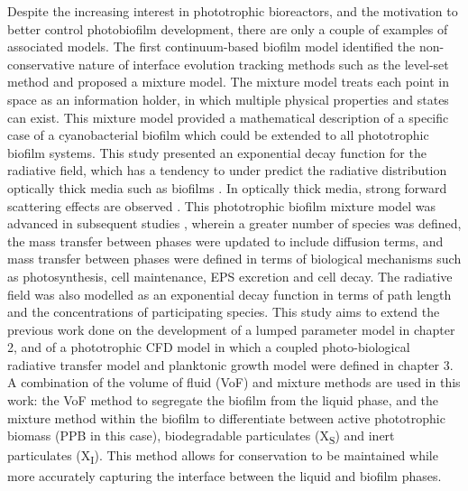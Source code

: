 Despite the increasing interest in phototrophic bioreactors, and the motivation to better control photobiofilm development, there are only a couple of examples of associated models. The first continuum-based biofilm model \cite{clarelli2013} identified the non-conservative nature of interface evolution tracking methods such as the level-set method \cite{alpkvist2007} and proposed a mixture model. The mixture model treats each point in space as an information holder, in which multiple physical properties and states can exist. This mixture model provided a mathematical description of a specific case of a cyanobacterial biofilm which could be extended to all phototrophic biofilm systems. This study presented an exponential decay function for the radiative field, which has a tendency to under predict the radiative distribution optically thick media such as biofilms \cite{jarosz2008}. In optically thick media, strong forward scattering effects are observed \cite{jarosz2008}. This phototrophic biofilm mixture model was advanced in subsequent studies \cite{polizzi2017}, wherein a greater number of species was defined, the mass transfer between phases were updated to include diffusion terms, and mass transfer between phases were defined in terms of biological mechanisms such as photosynthesis, cell maintenance, EPS excretion and cell decay. The radiative field was also modelled as an exponential decay function in terms of path length and the concentrations of participating species.
\skippingparagraph
This study aims to extend the previous work done on the development of a lumped parameter model in chapter 2, and of a phototrophic CFD model in which a coupled photo-biological radiative transfer model and planktonic growth model were defined in chapter 3. A combination of the volume of fluid (VoF) and mixture methods are used in this work: the VoF method to segregate the biofilm from the liquid phase, and the mixture method within the biofilm to differentiate between active phototrophic biomass (PPB  in this case), biodegradable particulates (X\textsubscript{S}) and inert particulates (X\textsubscript{I}). This method allows for conservation to be maintained while more accurately capturing the interface between the liquid and biofilm phases. 



